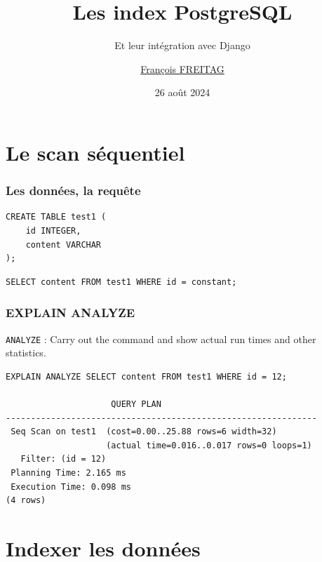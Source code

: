 \documentclass{beamer}
\title{Les index PostgreSQL}
\subtitle{Et leur intégration avec Django}
\author{\href{mailto:mail@franek.fr}{François FREITAG}}
\institute{Les emplois de l'inclusion \\ GIP Inclusion}
\date{26 août 2024}
\begin{document}

\begin{frame}
	\maketitle %
\end{frame}


\section{Le scan séquentiel} %

\begin{frame}[fragile]
    \frametitle{Les données, la requête}

    \begin{verbatim}
CREATE TABLE test1 (
    id INTEGER,
    content VARCHAR
);
    \end{verbatim}

    \begin{verbatim}
SELECT content FROM test1 WHERE id = constant;
    \end{verbatim}
\end{frame}

\begin{frame}[fragile]
    \frametitle{EXPLAIN ANALYZE}
    \texttt{ANALYZE} : Carry out the command and show actual run times and other statistics.
    \begin{verbatim}
EXPLAIN ANALYZE SELECT content FROM test1 WHERE id = 12;

                     QUERY PLAN
--------------------------------------------------------------
 Seq Scan on test1  (cost=0.00..25.88 rows=6 width=32)
                    (actual time=0.016..0.017 rows=0 loops=1)
   Filter: (id = 12)
 Planning Time: 2.165 ms
 Execution Time: 0.098 ms
(4 rows)
    \end{verbatim}
\end{frame}

\section{Indexer les données}
\end{document}
